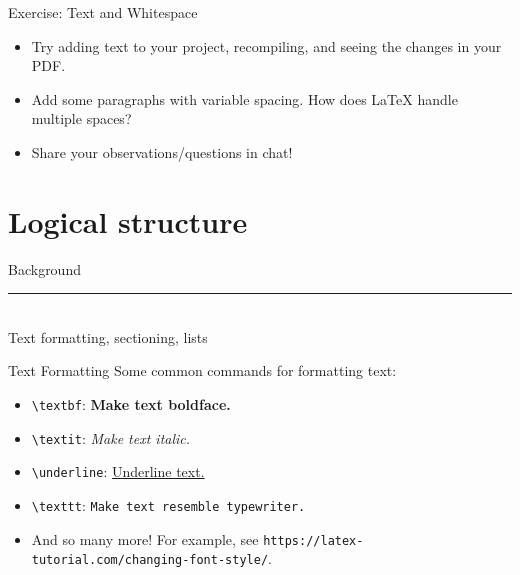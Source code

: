 \documentclass{beamer}
\begin{document}
{  \begin{frame}{Exercise: Text and Whitespace}
    \begin{itemize}
      \item Try adding text to your project, recompiling, and seeing the changes in your PDF.
      \item Add some paragraphs with variable spacing. How does \LaTeX{} handle multiple spaces?
      \item Share your observations/questions in chat!
    \end{itemize}
  \end{frame}

  \section{Logical structure}

  \begin{frame}[plain]
    \vfill
    \centering
    \begin{beamercolorbox}[sep=8pt,center,shadow=true,rounded=true]{Background}
      \insertsectionhead\par%
      \color{davisblue}\noindent\rule{10cm}{1pt} \\
      \footnotesize{Text formatting, sectioning, lists}
    \end{beamercolorbox}
    \vfill
  \end{frame}

  \begin{frame}{Text Formatting}
    Some common commands for formatting text:
    \begin{itemize}
      \item \texttt{\textbackslash textbf}: \textbf{Make text boldface.}
      \item \texttt{\textbackslash textit}: \textit{Make text italic.}
      \item \texttt{\textbackslash underline}: \underline{Underline text.}
      \item \texttt{\textbackslash texttt}: \texttt{Make text resemble typewriter.}
      \item And so many more! For example, see \texttt{https://latex-tutorial.com/changing-font-style/}.
    \end{itemize}
  \end{frame}

}
\end{document}
